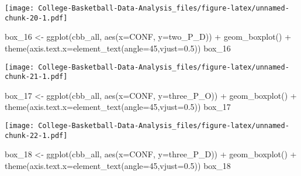 \documentclass[
]{article}
\newenvironment{Shaded}{\begin{snugshade}}{\end{snugshade}}
\newcommand{\AttributeTok}[1]{\textcolor[rgb]{0.77,0.63,0.00}{#1}}
\newcommand{\DecValTok}[1]{\textcolor[rgb]{0.00,0.00,0.81}{#1}}
\newcommand{\FloatTok}[1]{\textcolor[rgb]{0.00,0.00,0.81}{#1}}
\newcommand{\FunctionTok}[1]{\textcolor[rgb]{0.00,0.00,0.00}{#1}}
\newcommand{\NormalTok}[1]{#1}
\newcommand{\OtherTok}[1]{\textcolor[rgb]{0.56,0.35,0.01}{#1}}
\newcommand{\SpecialCharTok}[1]{\textcolor[rgb]{0.00,0.00,0.00}{#1}}
\begin{document}
\texttt{[image: College-Basketball-Data-Analysis\_files/figure-latex/unnamed-chunk-20-1.pdf]}

\begin{Shaded}
\begin{Highlighting}[]
\NormalTok{box\_16 }\OtherTok{\textless{}{-}} \FunctionTok{ggplot}\NormalTok{(cbb\_all, }\FunctionTok{aes}\NormalTok{(}\AttributeTok{x=}\NormalTok{CONF, }\AttributeTok{y=}\NormalTok{two\_P\_D)) }\SpecialCharTok{+} \FunctionTok{geom\_boxplot}\NormalTok{() }\SpecialCharTok{+} \FunctionTok{theme}\NormalTok{(}\AttributeTok{axis.text.x=}\FunctionTok{element\_text}\NormalTok{(}\AttributeTok{angle=}\DecValTok{45}\NormalTok{,}\AttributeTok{vjust=}\FloatTok{0.5}\NormalTok{))}
\NormalTok{box\_16}
\end{Highlighting}
\end{Shaded}

\texttt{[image: College-Basketball-Data-Analysis\_files/figure-latex/unnamed-chunk-21-1.pdf]}

\begin{Shaded}
\begin{Highlighting}[]
\NormalTok{box\_17 }\OtherTok{\textless{}{-}} \FunctionTok{ggplot}\NormalTok{(cbb\_all, }\FunctionTok{aes}\NormalTok{(}\AttributeTok{x=}\NormalTok{CONF, }\AttributeTok{y=}\NormalTok{three\_P\_O)) }\SpecialCharTok{+} \FunctionTok{geom\_boxplot}\NormalTok{() }\SpecialCharTok{+} \FunctionTok{theme}\NormalTok{(}\AttributeTok{axis.text.x=}\FunctionTok{element\_text}\NormalTok{(}\AttributeTok{angle=}\DecValTok{45}\NormalTok{,}\AttributeTok{vjust=}\FloatTok{0.5}\NormalTok{))}
\NormalTok{box\_17}
\end{Highlighting}
\end{Shaded}

\texttt{[image: College-Basketball-Data-Analysis\_files/figure-latex/unnamed-chunk-22-1.pdf]}

\begin{Shaded}
\begin{Highlighting}[]
\NormalTok{box\_18 }\OtherTok{\textless{}{-}} \FunctionTok{ggplot}\NormalTok{(cbb\_all, }\FunctionTok{aes}\NormalTok{(}\AttributeTok{x=}\NormalTok{CONF, }\AttributeTok{y=}\NormalTok{three\_P\_D)) }\SpecialCharTok{+} \FunctionTok{geom\_boxplot}\NormalTok{() }\SpecialCharTok{+} \FunctionTok{theme}\NormalTok{(}\AttributeTok{axis.text.x=}\FunctionTok{element\_text}\NormalTok{(}\AttributeTok{angle=}\DecValTok{45}\NormalTok{,}\AttributeTok{vjust=}\FloatTok{0.5}\NormalTok{))}
\NormalTok{box\_18}
\end{Highlighting}
\end{Shaded}
\end{document}
